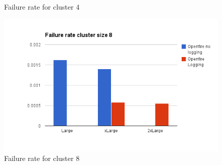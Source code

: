\documentclass[a4paper, twocolumn]{article}
\begin{document}
\begin{figure}[ht]
\begin{minipage}[b]{0.5\linewidth}
    \caption{Failure rate  for cluster 4} 
  \end{minipage}
  \hfill
  \begin{minipage}[b]{0.5\linewidth}
    \includegraphics[width=0.9\linewidth]{image__19_.png} 
    \caption{Failure rate  for cluster 8} 
  \end{minipage} 
\end{figure}
\end{document}
